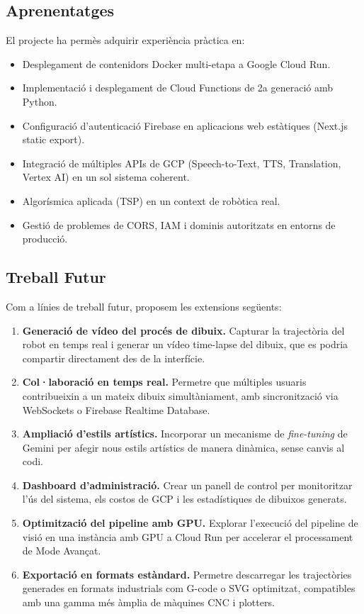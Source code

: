 \subsection{Aprenentatges}

El projecte ha permès adquirir experiència pràctica en:

\begin{itemize}
  \item Desplegament de contenidors Docker multi-etapa a Google Cloud Run.
  \item Implementació i desplegament de Cloud Functions de 2a generació amb Python.
  \item Configuració d'autenticació Firebase en aplicacions web estàtiques (Next.js static export).
  \item Integració de múltiples APIs de GCP (Speech-to-Text, TTS, Translation, Vertex AI) en un sol sistema coherent.
  \item Algorísmica aplicada (TSP) en un context de robòtica real.
  \item Gestió de problemes de CORS, IAM i dominis autoritzats en entorns de producció.
\end{itemize}

\subsection{Treball Futur}

Com a línies de treball futur, proposem les extensions següents:

\begin{enumerate}
  \item \textbf{Generació de vídeo del procés de dibuix.} Capturar la trajectòria del robot en temps real i generar un vídeo time-lapse del dibuix, que es podria compartir directament des de la interfície.

  \item \textbf{Col·laboració en temps real.} Permetre que múltiples usuaris contribueixin a un mateix dibuix simultàniament, amb sincronització via WebSockets o Firebase Realtime Database.

  \item \textbf{Ampliació d'estils artístics.} Incorporar un mecanisme de \textit{fine-tuning} de Gemini per afegir nous estils artístics de manera dinàmica, sense canvis al codi.

  \item \textbf{Dashboard d'administració.} Crear un panell de control per monitoritzar l'ús del sistema, els costos de GCP i les estadístiques de dibuixos generats.

  \item \textbf{Optimització del pipeline amb GPU.} Explorar l'execució del pipeline de visió en una instància amb GPU a Cloud Run per accelerar el processament de Mode Avançat.

  \item \textbf{Exportació en formats estàndard.} Permetre descarregar les trajectòries generades en formats industrials com G-code o SVG optimitzat, compatibles amb una gamma més àmplia de màquines CNC i plotters.
\end{enumerate}
